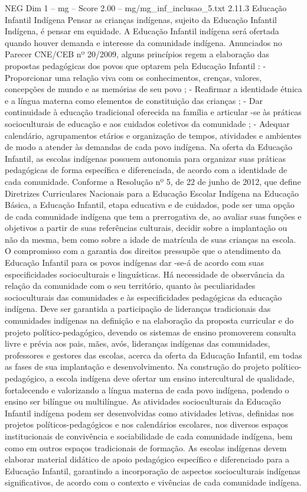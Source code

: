 \begin{textsample}{NEG Dim 1 – mg – Score 2.00 – mg/mg\_inf\_inclusao\_5.txt}  \label{ex:f1_neg_051}
2.11.3 Educação Infantil Indígena Pensar as crianças indígenas, sujeito da Educação Infantil Indígena, é pensar em equidade.
A Educação Infantil indígena será ofertada quando houver demanda e interesse da comunidade indígena.
Anunciados no Parecer CNE/CEB nº 20/2009, alguns princípios regem a elaboração das propostas pedagógicas dos povos que optarem pela Educação Infantil : - Proporcionar uma relação viva com os conhecimentos, crenças, valores, concepções de mundo e as memórias de seu povo ; - Reafirmar a identidade étnica e a língua materna como elementos de constituição das crianças ; - Dar continuidade à educação tradicional oferecida na família e articular -se às práticas socioculturais de educação e aos cuidados coletivos da comunidade ; - Adequar calendário, agrupamentos etários e organização de tempos, atividades e ambientes de modo a atender às demandas de cada povo indígena.
Na oferta da Educação Infantil, as escolas indígenas possuem autonomia para organizar suas práticas pedagógicas de forma específica e diferenciada, de acordo com a identidade de cada comunidade.
Conforme a Resolução nº 5, de 22 de junho de 2012, que define Diretrizes Curriculares Nacionais para a Educação Escolar Indígena na Educação Básica, a Educação Infantil, etapa educativa e de cuidados, pode ser uma opção de cada comunidade indígena que tem a prerrogativa de, ao avaliar suas funções e objetivos a partir de suas referências culturais, decidir sobre a implantação ou não da mesma, bem como sobre a idade de matrícula de suas crianças na escola.
O compromisso com a garantia dos direitos pressupõe que o atendimento da Educação Infantil para os povos indígenas dar -se-á de acordo com suas especificidades socioculturais e linguísticas.
Há necessidade de observância da relação da comunidade com o seu território, quanto às peculiaridades socioculturais das comunidades e às especificidades pedagógicas da educação indígena.
Deve ser garantida a participação de lideranças tradicionais das comunidades indígenas na definição e na elaboração da proposta curricular e do projeto político-pedagógico, devendo os sistemas de ensino promoverem consulta livre e prévia aos pais, mães, avós, lideranças indígenas das comunidades, professores e gestores das escolas, acerca da oferta da Educação Infantil, em todas as fases de sua implantação e desenvolvimento.
Na construção do projeto político-pedagógico, a escola indígena deve ofertar um ensino intercultural de qualidade, fortalecendo e valorizando a língua materna de cada povo indígena, podendo o ensino ser bilíngue ou multilíngue.
As atividades socioculturais da Educação Infantil indígena podem ser desenvolvidas como atividades letivas, definidas nos projetos políticos-pedagógicos e nos calendários escolares, nos diversos espaços institucionais de convivência e sociabilidade de cada comunidade indígena, bem como em outros espaços tradicionais de formação.
As escolas indígenas devem elaborar material didático de apoio pedagógico específico e diferenciado para a Educação Infantil, garantindo a incorporação de aspectos socioculturais indígenas significativos, de acordo com o contexto e vivências de cada comunidade indígena.

\end{textsample}

